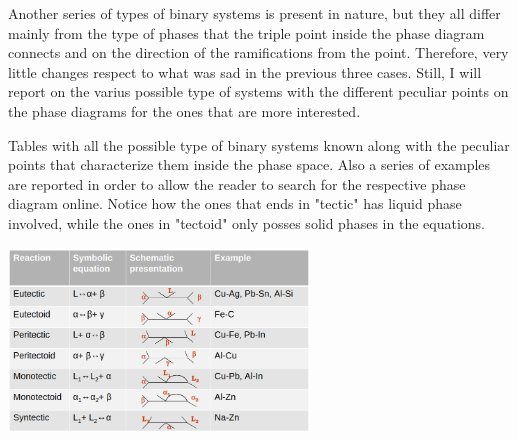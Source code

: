 \nt
{
    Another series of types of binary systems is present in nature, but they all differ mainly from the type of phases that the triple point inside the phase diagram connects and on the direction of the ramifications from the point. Therefore, very little changes respect to what was sad in the previous three cases. Still, I will report on  the varius possible type of systems with the different peculiar points on the phase diagrams for the ones that are more interested.
}

\begin{table}
    \centering
    \caption
    {
        Tables with all the possible type of binary systems known along with the peculiar points that characterize them inside the phase space. Also a series of examples are reported in order to allow the reader to search for the respective phase diagram online. Notice how the ones that ends in "tectic" has liquid phase involved, while the ones in "tectoid" only posses solid phases in the equations.
    }
    \label{tab:TabSys}
    \includegraphics[width=0.6\textwidth]{Immagini/TabSyst.png}
\end{table}